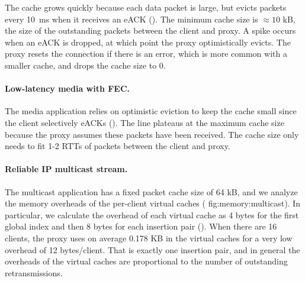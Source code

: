 The cache grows quickly because each data packet is large, but evicts
packets every 10~ms when
it receives an eACK (). The minimum cache size is
$\approx\!10$ kB, the size of the outstanding packets between the client and
proxy. A spike occurs when an eACK is dropped, at which point the proxy
optimistically evicts. The proxy resets the connection if there is an
error, which is more common with a smaller cache, and drops the cache
size to 0.

\paragraph{Low-latency media with FEC.}

The media application relies on optimistic eviction to keep the cache small
since the client selectively eACKs (). The
line plateaus at the maximum cache size because the proxy
assumes these packets have been received. The cache size only needs to fit 1-2
RTTs of packets between the client and proxy.

\paragraph{Reliable IP multicast stream.}

The multicast application has a fixed packet cache size of 64 kB, and we analyze
the memory overheads of the per-client virtual caches (\Cref
{fig:memory:multicast}). In particular, we calculate the overhead of each
virtual cache as 4 bytes for the first global index and then 8 bytes for each
insertion pair (). When there are 16 clients,
the proxy uses on average 0.178 KB in the virtual caches for a very low
overhead of 12 bytes/client. That is exactly one insertion pair, and in general
the overheads of the virtual caches are proportional to the number of
outstanding retransmissions.
